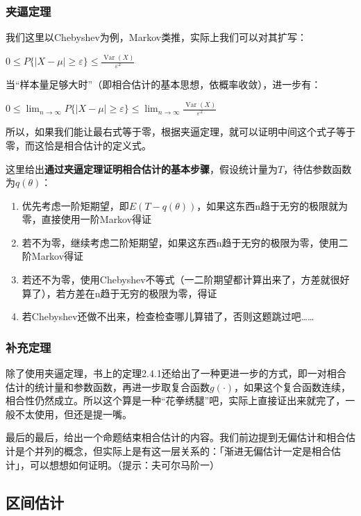 \documentclass[10pt, a4paper]{article}
\begin{document}
\subsubsection{夹逼定理}
我们这里以Chebyshev为例，Markov类推，实际上我们可以对其扩写：
\begin{center}
    $0 \leq  P\{|X-\mu| \geq \varepsilon\} \leq \frac{\operatorname{Var}(X)}{\varepsilon^{2}}$
\end{center}
当“样本量足够大时”（即相合估计的基本思想，依概率收敛），进一步有：
\begin{center}
    $0 \leq \lim _{n \rightarrow \infty} P\{|X-\mu| \geq \varepsilon\} \leq \lim _{n \rightarrow \infty} \frac{\operatorname{Var}(X)}{\varepsilon^{2}}$
\end{center}

所以，如果我们能让最右式等于零，根据夹逼定理，就可以证明中间这个式子等于零，而这恰是相合估计的定义式。\par
这里给出\textbf{通过夹逼定理证明相合估计的基本步骤}，假设统计量为$T$，待估参数函数为$q(\theta)$：
\begin{enumerate}
    \item 优先考虑一阶矩期望，即$E(T- q(\theta))$，如果这东西n趋于无穷的极限就为零，直接使用一阶Markov得证
    \item 若不为零，继续考虑二阶矩期望，如果这东西n趋于无穷的极限为零，使用二阶Markov得证
    \item 若还不为零，使用Chebyshev不等式（一二阶期望都计算出来了，方差就很好算了），若方差在n趋于无穷的极限为零，得证
    \item 若Chebyshev还做不出来，检查检查哪儿算错了，否则这题跳过吧……
\end{enumerate}

\subsubsection{补充定理}

除了使用夹逼定理，书上的定理2.4.1还给出了一种更进一步的方式，即一对相合估计的统计量和参数函数，再进一步取复合函数$g(·)$，如果这个复合函数连续，相合性仍然成立。所以这个算是一种“花拳绣腿”吧，实际上直接证出来就完了，一般不太使用，但还是提一嘴。\\\par

最后的最后，给出一个命题结束相合估计的内容。我们前边提到无偏估计和相合估计是个并列的概念，但实际上是有这一层关系的：「渐进无偏估计一定是相合估计」，可以想想如何证明。（提示：夫可尔马阶一）

\subsection{区间估计}
\end{document}
